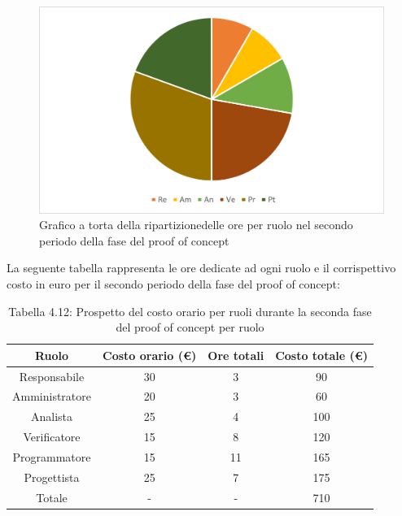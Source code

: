 \begin{figure}[H]
    \centering
    \includegraphics[scale=0.6]{img/grafi preventivo/torta/proof/periodo2.png}
    \caption{Grafico a torta della ripartizionedelle ore per ruolo nel secondo periodo della fase del proof of concept}
\end{figure}
La seguente tabella rappresenta le ore dedicate ad ogni ruolo e il corrispettivo costo in euro per il secondo periodo della fase del proof of concept:
\begin{table}[h]
	\setlength\extrarowheight{5pt}
	\centering
	\begin{tabularx}{\textwidth}{|ccc|c|}
		\hline
		\rowcolor{white}
		\textbf{Ruolo} & \textbf{Costo orario (€)} & \textbf{Ore totali} & \textbf{Costo totale (€)} \\
		\hline
		Responsabile &30&3&90 \\
		Amministratore &20&3&60 \\
		Analista &25&4&100 \\
		Verificatore &15&8&120 \\
		Programmatore &15&11&165 \\
		Progettista &25&7&175 \\
		\hline
		Totale &-&-&710 \\
		\hline
	\end{tabularx}
    \vspace{10pt}
	\caption{Tabella 4.12: Prospetto del costo orario per ruoli durante la seconda fase del proof of concept per ruolo}
\end{table}
\newpage
